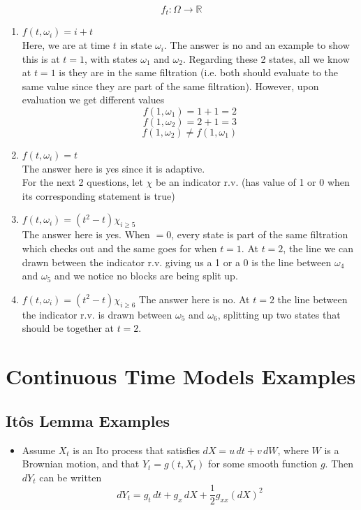 \documentclass[11pt]{article}
\begin{document}
\[f_t : \Omega \rightarrow \mathbb{R}\]
\begin{enumerate}
    \item $f(t, \omega_i) = i + t$ \\ 
    Here, we are at time $t$ in state $\omega_i$. The answer is no and an example to show this 
    is at $t=1$, with states $\omega_1$ and $\omega_2$. Regarding these 2 states, all we know 
    at $t=1$ is they are in the same filtration (i.e. both should evaluate to the same value 
    since they are part of the same filtration). However, upon evaluation we get different 
    values 
    \[f(1, \omega_1) = 1 + 1 = 2 \]
    \[f(1, \omega_2) = 2 + 1 = 3 \]
    \[f(1, \omega_2) \ne f(1, \omega_1) \]


    \item $f(t, \omega_i) = t$ \\ 
    The answer here is yes since it is adaptive. \\
    
    For the next 2 questions, let $\chi$ be an indicator r.v. (has value of 1 or 0 when its 
    corresponding statement is true)
    \item $f(t, \omega_i) = {(t^2 - t)}{\chi_{i \ge 5}}$ \\ 
    The answer here is yes. When $=0$, every state is part of the same filtration which checks 
    out and the same goes for when $t=1$. At $t=2$, the line we can drawn between the 
    indicator r.v. giving us a 1 or a 0 is the line between $\omega_4$ and $\omega_5$ and we 
    notice no blocks are being split up.

    \item $f(t, \omega_i) = {(t^2 - t)}{\chi_{i \ge 6}}$
    The answer here is no. At $t=2$ the line between the indicator r.v. is drawn between 
    $\omega_5$ and $\omega_6$, splitting up two states that should be together at $t=2$.
\end{enumerate}

\section{Continuous Time Models Examples}


\subsection{It\^{o}s Lemma Examples}
\begin{itemize}
    \item Assume $X_t$ is an Ito process that satisfies $dX = u \, dt + v \,dW$, where $W$ is 
    a Brownian motion, and that $Y_t = g(t, X_t)$ for some smooth function $g$. Then $dY_t$ 
    can be written 
    \[dY_t = g_t \,dt + g_x \,dX + \frac{1}{2} g_{xx} {(dX)}^2\]
\end{itemize}
\end{document}
